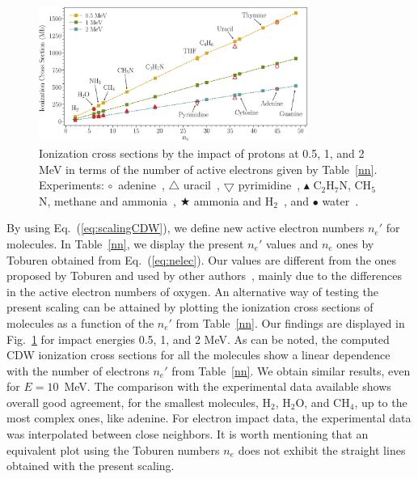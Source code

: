 \documentclass[10pt,showpacs,showkeys,twocolumn]{revtex4}
\begin{document}
\begin{figure}[t!]
\centering
\includegraphics[width=0.785\textwidth]{figuras/scale_ne.eps}
\caption{Ionization cross sections by the impact of protons at 0.5, 1,
and 2 MeV in terms of the number of active electrons given by Table~\ref{nn}.
Experiments: 
\mbox{\Large$\circ$}~adenine~\cite{iriki2011}, 
$\triangle$ uracil~\cite{itoh2013}, 
$\bigtriangledown$ pyrimidine~\cite{wolff2014}, 
$\blacktriangle$ C$_2$H$_7$N, CH$_5$N, methane and ammonia~\cite{lynch1976},
\mbox{\scriptsize$\bigstar$} ammonia and H$_2$~\cite{rudd1985}, and 
\mbox{\Large$\bullet$} water~\cite{luna2007}.}
\label{fig:recta}
\end{figure}

By using Eq.~(\ref{eq:scalingCDW}), we define new active electron 
numbers $n_e'$ for molecules. In Table~\ref{nn}, we display the present 
$n_e'$ values and $n_e$ ones by Toburen obtained from Eq.~(\ref{eq:nelec}).
Our values are different from the ones proposed by Toburen and used by 
other authors~\cite{itoh2013}, mainly due to the differences in the 
active electron numbers of oxygen. An alternative way of testing 
the present scaling can be attained by plotting the ionization cross sections 
of molecules as a function of the $n_e'$ from Table~\ref{nn}. Our 
findings are displayed in Fig.~\ref{fig:recta} for 
impact energies 0.5, 1, and 2 MeV. As can be noted, the computed CDW 
ionization cross sections for all the molecules show a linear 
dependence with the number of electrons $n_e'$ from Table~\ref{nn}.
We obtain similar results, even for $E=10$~MeV. The comparison with the 
experimental data available shows overall good agreement, for the 
smallest molecules, H$_2$, H$_2$O, and CH$_4$, up to the most complex 
ones, like adenine. For electron impact data, the experimental data was 
interpolated between close neighbors.
It is worth mentioning that an equivalent plot using the Toburen numbers 
$n_e$ does not exhibit the straight lines obtained with the present scaling. 
\end{document}
